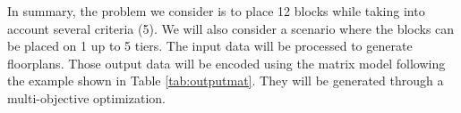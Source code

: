 In summary, the problem we consider is to place 12 blocks while taking into account several criteria (5). We will also consider a scenario where the blocks can be placed on 1 up to 5 tiers. The input data will be processed to generate floorplans. Those output data will be encoded using the matrix model following the example shown in Table \ref{tab:outputmat}. They will be generated through a multi-objective optimization.


